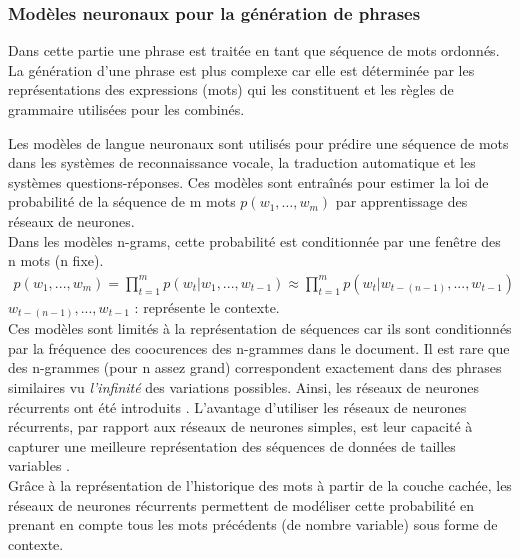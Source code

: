 \subsubsection{Modèles neuronaux pour la génération de phrases} \label{phrasegen}

 Dans cette partie une phrase est traitée en tant que séquence de mots ordonnés. %
La génération d'une phrase est plus complexe car elle est déterminée par les représentations des expressions (mots) qui les constituent et les règles de grammaire utilisées pour les combinés. 

Les modèles de langue neuronaux sont utilisés pour prédire une séquence de mots dans les systèmes de reconnaissance vocale, la traduction automatique et les systèmes questions-réponses. Ces modèles sont entraînés pour estimer la loi de probabilité de la séquence de m mots $p(w_{1},…,w_{m})$ par apprentissage des réseaux de neurones.\\
Dans les modèles n-grams, cette probabilité  est conditionnée par une fenêtre des n mots (n fixe).
\begin{eqnarray}
p(w_1,...,w_m) = \prod_{t=1}^{m} p(w_t | w_{1},...,w_{t-1}) \approx \prod_{t=1}^{m} p(w_t | w_{t-(n-1)},...,w_{t-1})
\end{eqnarray}
$w_{t-(n-1)},...,w_{t-1}$ : représente le contexte.\\
Ces modèles sont limités à la représentation de séquences car ils sont conditionnés par la fréquence des coocurences des n-grammes dans le document. Il est rare que des n-grammes (pour n assez grand) correspondent exactement dans des phrases similaires vu \textit{l'infinité} des variations possibles. 
Ainsi, les réseaux de neurones récurrents ont été introduits \cite{mikolov2010recurrent} \cite{mikolov2011extensions}.
L'avantage d'utiliser les réseaux de neurones récurrents, par rapport aux réseaux de neurones simples, est leur capacité à capturer une meilleure  représentation des séquences de données de tailles variables \cite{schmidhuber2015deep}.\\
Grâce à la représentation de l'historique des mots à partir de la couche cachée, les réseaux de neurones récurrents permettent de modéliser cette probabilité en prenant en compte tous les mots précédents (de nombre variable) sous forme de contexte. \\

